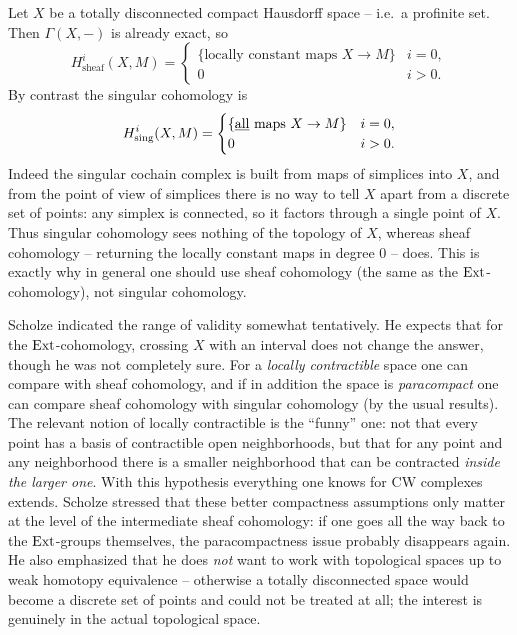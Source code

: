 \begin{example}
\label{ex:4:totally-disconnected}
Let $X$ be a totally disconnected compact Hausdorff space -- i.e.\ a profinite
set. Then $\Gamma(X,-)$ is already exact, so
\begin{equation*}
H^{i}_{\mathrm{sheaf}}(X,M)=
\begin{cases}
\{\text{locally constant maps }X\to M\} & i=0,\\
0 & i>0.
\end{cases}
\end{equation*}
By contrast the singular cohomology is
\begin{equation*}
H^{i}_{\mathrm{sing}}(X,M)=
\begin{cases}
\{\text{\underline{all} maps }X\to M\} & i=0,\\
0 & i>0.
\end{cases}
\end{equation*}
Indeed the singular cochain complex is built from maps of simplices into $X$, and
from the point of view of simplices there is no way to tell $X$ apart from a
discrete set of points: any simplex is connected, so it factors through a single
point of $X$. Thus singular cohomology sees nothing of the topology of $X$,
whereas sheaf cohomology -- returning the locally constant maps in degree $0$
-- does. This is exactly why in general one should use sheaf cohomology (the
same as the $\operatorname{Ext}$-cohomology), not singular cohomology.
\end{example}

\begin{remark}
\label{rmk:4:locally-contractible}
Scholze indicated the range of validity somewhat tentatively. He expects that
for the $\operatorname{Ext}$-cohomology, crossing $X$ with an interval does not change the
answer, though he was not completely sure. For a \emph{locally contractible}
space one can compare with sheaf cohomology, and if in addition the space is
\emph{paracompact} one can compare sheaf cohomology with singular cohomology (by
the usual results). The relevant notion of locally contractible is the ``funny''
one: not that every point has a basis of contractible open neighborhoods, but
that for any point and any neighborhood there is a smaller neighborhood that can
be contracted \emph{inside the larger one}. With this hypothesis everything one
knows for CW complexes extends. Scholze stressed that these better compactness
assumptions only matter at the level of the intermediate sheaf cohomology: if one
goes all the way back to the $\operatorname{Ext}$-groups themselves, the paracompactness issue
probably disappears again. He also emphasized that he does \emph{not} want to
work with topological spaces up to weak homotopy equivalence -- otherwise a
totally disconnected space would become a discrete set of points and could not be
treated at all; the interest is genuinely in the actual topological space.
\end{remark}


